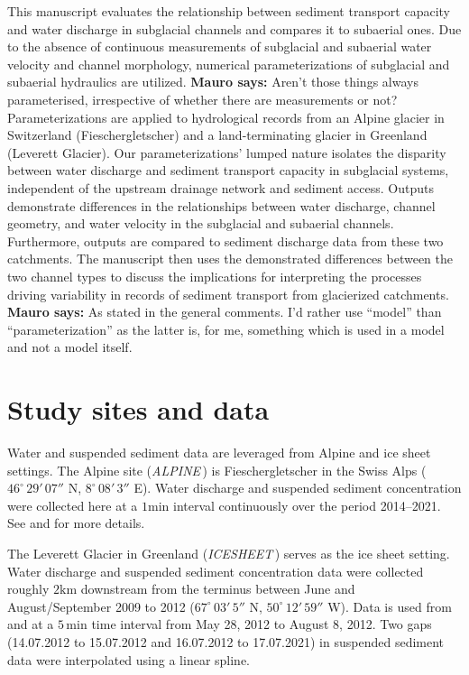 \documentclass[draft]{agujournal2019}
\newcommand{\mauro}[1]{{\textbf{\color{green}Mauro says:} \color{green} #1} }
\newcommand{\alpine}{\textit{ALPINE}\,}
\newcommand{\icesheet}{\textit{ICESHEET}\,}
\newcommand{\unit}[1]{$\mathrm{#1}$}
\begin{document}
This manuscript evaluates the relationship between sediment transport capacity and water discharge in subglacial channels and compares it to subaerial ones.
Due to the absence of continuous measurements of subglacial and subaerial water velocity and channel morphology, numerical parameterizations of subglacial and subaerial hydraulics are utilized. \mauro{Aren't those things always parameterised, irrespective of whether there are measurements or not?}
Parameterizations are applied to hydrological records from an Alpine glacier in Switzerland (Fieschergletscher) and  a land-terminating glacier in Greenland (Leverett Glacier).
Our parameterizations' lumped nature isolates the disparity between water discharge and sediment transport capacity in subglacial systems, independent of the upstream drainage network and sediment access.
Outputs demonstrate differences in the relationships between  water discharge, channel geometry, and water velocity in the subglacial and subaerial channels.
Furthermore, outputs are compared to sediment discharge data from these two catchments.
The manuscript then uses the demonstrated differences between the two channel types to discuss the implications for interpreting the processes driving variability in records of sediment transport from glacierized catchments.
\mauro{As stated in the general comments.  I'd rather use ``model'' than ``parameterization'' as the latter is, for me, something which is used in a model and not a model itself.}

\section{Study sites and data}
\label{sect:ss_data}

Water and suspended sediment data are leveraged from Alpine and ice sheet settings.
The Alpine site (\alpine) is  Fieschergletscher in the Swiss Alps ($46^\circ\,29'\,07''$ N, $8^\circ\,08'\,3''$ E).
Water discharge and suspended sediment concentration were collected here at a $1$\unit{min} interval continuously over the period 2014--2021.
See  and  for more details.

The Leverett Glacier in Greenland (\icesheet) serves as the ice sheet setting.
Water discharge and suspended sediment concentration data were collected roughly $2$\unit{km} downstream from the terminus between June and August/September 2009 to 2012 ($67^\circ\,03'\,5''$ N, $50^\circ\,12'\,59''$ W).
Data is used from  and  at a $5$\,\unit{min} time interval from May 28, 2012 to August 8, 2012.
Two gaps (14.07.2012 to 15.07.2012 and 16.07.2012 to 17.07.2021) in suspended sediment data were interpolated using a linear spline.
\end{document}

